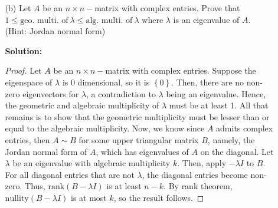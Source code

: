 \documentclass[letterpaper,12pt]{article}
\newcommand{\set}[1]{\left\{ #1 \right\}}
\theoremstyle{definition}
\begin{document}
\begin{itemize}
    \item[] \begin{enumerate}
        \item[(b)]Let $A$ be an $n\times n-$matrix with complex entries. Prove that $1 \leq \text{geo. multi. of} \ \lambda \leq \text{alg. multi. of} \ \lambda$ where $\lambda$ is an eigenvalue of $A$. (Hint: Jordan normal form)
        \begin{mdframed}
            \textbf{Solution:} \begin{proof}
                Let $A$ be an $n\times n-$matrix with complex entries. Suppose the eigenspace of $\lambda$ is 0 dimensional, so it is $\set{0}$. Then, there are no non-zero eigenvectors for $\lambda$, a contradiction to $\lambda$ being an eigenvalue. Hence, the geometric and algebraic multiplicity of $\lambda$ must be at least 1. All that remains is to show that the geometric multiplicity must be lesser than or equal to the algebraic multiplicity. Now, we know since $A$ admits complex entries, then $A \sim B$ for some upper triangular matrix $B$, namely, the Jordan normal form of $A$, which has eigenvalues of $A$ on the diagonal. Let $\lambda$ be an eigenvalue with algebraic multiplicity $k$. Then, apply $-\lambda I$ to $B$. For all diagonal entries that are not $\lambda$, the diagonal entries become non-zero. Thus, $\mathrm{rank}(B - \lambda I)$ is at least $n-k$. By rank theorem, $\mathrm{nullity}(B - \lambda I)$ is at most $k$, so the result follows.
            \end{proof}
        \end{mdframed}
    \end{enumerate}
\end{itemize}
\pagebreak
\end{document}
